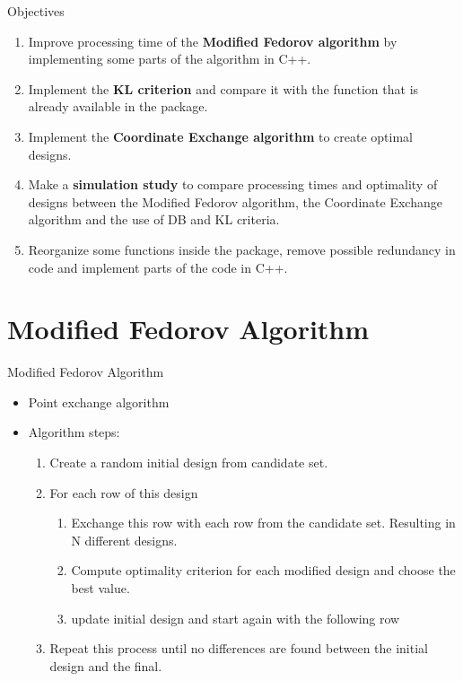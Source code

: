 \documentclass[11pt,t]{beamer}
\begin{document}
\begin{frame}[fragile]{Objectives}
	\begin{enumerate}
		\item Improve processing time of the \textbf{Modified Fedorov algorithm} by implementing some parts of the algorithm in C++. %
		\item Implement the \textbf{KL criterion} and compare it with the function that is already available in the package.
		\item Implement the \textbf{Coordinate Exchange algorithm} to create optimal designs.
		\item Make a \textbf{simulation study} to compare processing times and optimality of designs between the Modified Fedorov algorithm, the Coordinate Exchange algorithm and the use of DB and KL criteria.
		\item Reorganize some functions inside the package, remove possible redundancy in code and implement parts of the code in C++.
	\end{enumerate}
\end{frame}

\section{Modified Fedorov Algorithm}
\begin{frame}{Modified Fedorov Algorithm}
	\begin{itemize}
		\item Point exchange algorithm
		\item Algorithm steps:
		\begin{enumerate}
			\item Create a random initial design from candidate set.
			\item For each row of this design
			\begin{enumerate}
				\item Exchange this row with each row from the candidate set. Resulting in N different designs.
				\item Compute optimality criterion for each modified design and choose the best value.
				\item update initial design and start again with the following row
			\end{enumerate}
			\item Repeat this process until no differences are found between the initial design and the final.
		\end{enumerate}
	\end{itemize}
\end{frame}
\end{document}
